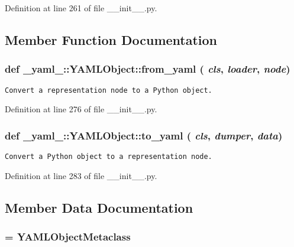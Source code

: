 Definition at line 261 of file \_\-\_\-init\_\-\_\-.py.

\subsection{Member Function Documentation}
\subsubsection{\setlength{\rightskip}{0pt plus 5cm}def {\bf \_\-yaml\_\-::YAMLObject::from\_\-yaml} ( {\em cls},  {\em loader},  {\em node})}\label{class__yaml___1_1YAMLObject_c8ef4848f33ecda7db55772238fef3d5}




\footnotesize\begin{verbatim}
Convert a representation node to a Python object.
\end{verbatim}
\normalsize
 

Definition at line 276 of file \_\-\_\-init\_\-\_\-.py.
\subsubsection{\setlength{\rightskip}{0pt plus 5cm}def {\bf \_\-yaml\_\-::YAMLObject::to\_\-yaml} ( {\em cls},  {\em dumper},  {\em data})}\label{class__yaml___1_1YAMLObject_6eb2db52a69b8c13213e46f0caaa852c}




\footnotesize\begin{verbatim}
Convert a Python object to a representation node.
\end{verbatim}
\normalsize
 

Definition at line 283 of file \_\-\_\-init\_\-\_\-.py.

\subsection{Member Data Documentation}
\subsubsection{ = {\bf YAMLObjectMetaclass}\hspace{0.3cm}{\tt  [static, private]}}\label{class__yaml___1_1YAMLObject_2e773316b563499fcf8ffedacd96519c}




